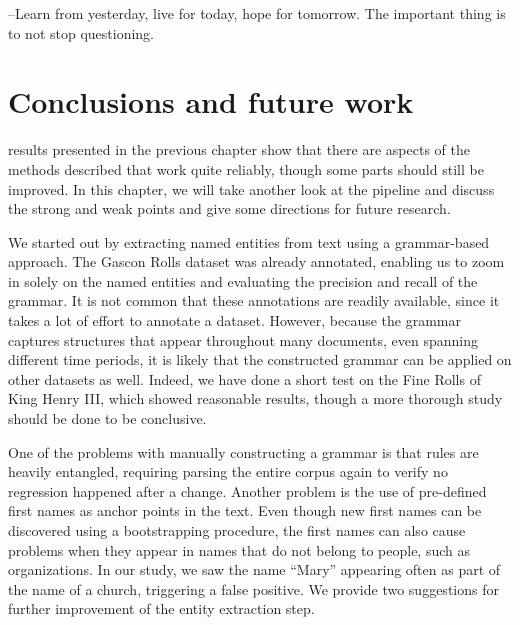 \begin{savequote}[75mm] 
--Learn from yesterday, live for today, hope for tomorrow. The important thing is to not stop questioning.
\end{savequote}




\chapter{Conclusions and future work}
\label{ch:conclusions}

 results presented in the previous chapter show that there are aspects of the methods described that work quite reliably, though some parts should still be improved.
In this chapter, we will take another look at the pipeline and discuss the strong and weak points and give some directions for future research.

We started out by extracting named entities from text using a grammar-based approach.
The Gascon Rolls dataset was already annotated, enabling us to zoom in solely on the named entities and evaluating the precision and recall of the grammar.
It is not common that these annotations are readily available, since it takes a lot of effort to annotate a dataset.
However, because the grammar captures structures that appear throughout many documents, even spanning different time periods, it is likely that the constructed grammar can be applied on other datasets as well.
Indeed, we have done a short test on the Fine Rolls of King Henry III, which showed reasonable results, though a more thorough study should be done to be conclusive.

One of the problems with manually constructing a grammar is that rules are heavily entangled, requiring parsing the entire corpus again to verify no regression happened after a change.
Another problem is the use of pre-defined first names as anchor points in the text.
Even though new first names can be discovered using a bootstrapping procedure, the first names can also cause problems when they appear in names that do not belong to people, such as organizations.
In our study, we saw the name ``Mary'' appearing often as part of the name of a church, triggering a false positive.
We provide two suggestions for further improvement of the entity extraction step.

